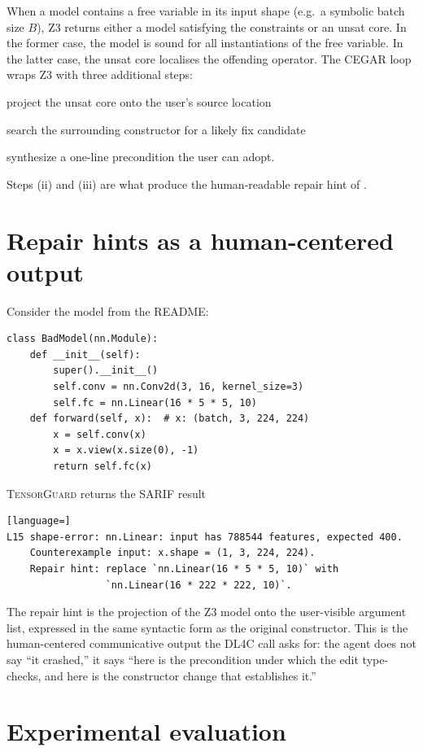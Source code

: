 \documentclass{article}
\theoremstyle{definition}
\newcommand{\TensorGuard}{\textsc{TensorGuard}}
\begin{document}
When a model contains a free variable in its input shape (e.g.\ a
symbolic batch size $B$), Z3 returns either a model satisfying the
constraints or an unsat core.  In the former case, the model is
sound for all instantiations of the free variable.  In the latter
case, the unsat core localises the offending operator.  The CEGAR
loop wraps Z3 with three additional steps:
\begin{enumerate*}[label=(\roman*),itemjoin={; },itemjoin*={; and finally }]
  \item project the unsat core onto the user's source location
  \item search the surrounding constructor for a likely fix candidate
  \item synthesize a one-line precondition the user can adopt.
\end{enumerate*}
Steps (ii) and (iii) are what produce the human-readable repair hint
of .

\section{Repair hints as a human-centered output}
\label{sec:repair-hints}

Consider the model from the README:
\begin{lstlisting}
class BadModel(nn.Module):
    def __init__(self):
        super().__init__()
        self.conv = nn.Conv2d(3, 16, kernel_size=3)
        self.fc = nn.Linear(16 * 5 * 5, 10)
    def forward(self, x):  # x: (batch, 3, 224, 224)
        x = self.conv(x)
        x = x.view(x.size(0), -1)
        return self.fc(x)
\end{lstlisting}
\TensorGuard{} returns the SARIF result
\begin{lstlisting}[language=]
L15 shape-error: nn.Linear: input has 788544 features, expected 400.
    Counterexample input: x.shape = (1, 3, 224, 224).
    Repair hint: replace `nn.Linear(16 * 5 * 5, 10)` with
                 `nn.Linear(16 * 222 * 222, 10)`.
\end{lstlisting}
The repair hint is the projection of the Z3 model onto the
user-visible argument list, expressed in the same syntactic form as
the original constructor.  This is the human-centered communicative
output the DL4C call asks for: the agent does not say ``it crashed,''
it says ``here is the precondition under which the edit type-checks,
and here is the constructor change that establishes it.''

\section{Experimental evaluation}\label{sec:experiments}
\end{document}
